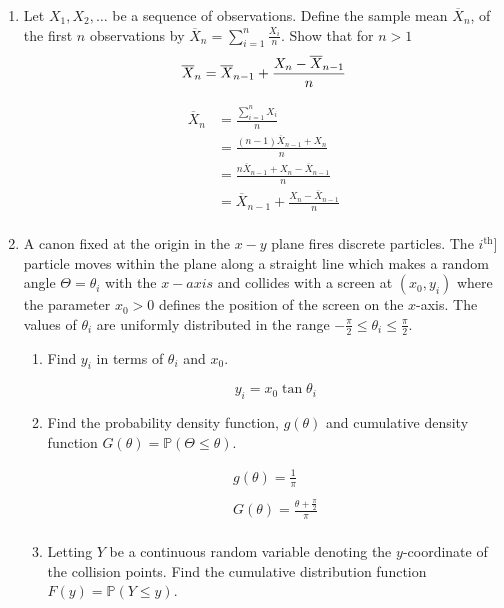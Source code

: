 \documentclass[10pt,\jkfside,a4paper]{article}
\begin{document}
\begin{enumerate}
\begin{enumerate}
\end{enumerate}

\item
Let $X_1, X_2, \dots$ be a sequence of observations.
Define the sample mean $\overline{X}_n$, of the first $n$ observations by
$\overline{X}_n = \sum^n_{i=1} \frac{X_i}{n}$.
Show that for $n > 1$
\[
\overline{X}_n = \overline{X}_{n-1} + \frac{X_n - \overline{X}_{n-1}}{n} \\
\]

\[
\begin{split}
\overline{X}_n &= \frac{\sum^n_{i=1} X_i}{n} \\
               &= \frac{(n - 1)\overline{X}_{n-1} + X_n}{n} \\
               &= \frac{n\overline{X}_{n-1} + X_n - \overline{X}_{n-1}}{n} \\
               &= \overline{X}_{n-1} + \frac{X_n - \overline{X}_{n-1}}{n} \\
\end{split}
\]

\item A canon fixed at the origin in the $x-y$ plane fires discrete particles.
The $i^\text{th}]$ particle moves within the plane along a straight line which makes a random
angle $\Theta = \theta_i$ with the $x-axis$ and collides with a screen at $(x_0, y_i)$ where
the parameter $x_0 > 0$ defines the position of the screen on the $x$-axis.
The values of $\theta_i$ are uniformly distributed in the range $-\frac{\pi}{2} \leq \theta_i \leq \frac{\pi}{2}$.

\begin{enumerate}

\item
Find $y_i$ in terms of $\theta_i$ and $x_0$.

\[
    y_i = x_0\tan \theta_i
\]

\item
Find the probability density function, $g(\theta)$ and cumulative density function
$G(\theta) = \mathbb{P}(\Theta \leq \theta)$.

\begin{gather*}
    g(\theta) = \frac{1}{\pi} \\\\
    G(\theta) = \frac{\theta + \frac{\pi}{2}}{\pi}\\
\end{gather*}

\item
Letting $Y$ be a continuous random variable denoting the $y$-coordinate of the
collision points.
Find the cumulative distribution function $F(y) = \mathbb{P}(Y \leq y)$.


\end{enumerate}
\end{enumerate}
\end{document}
